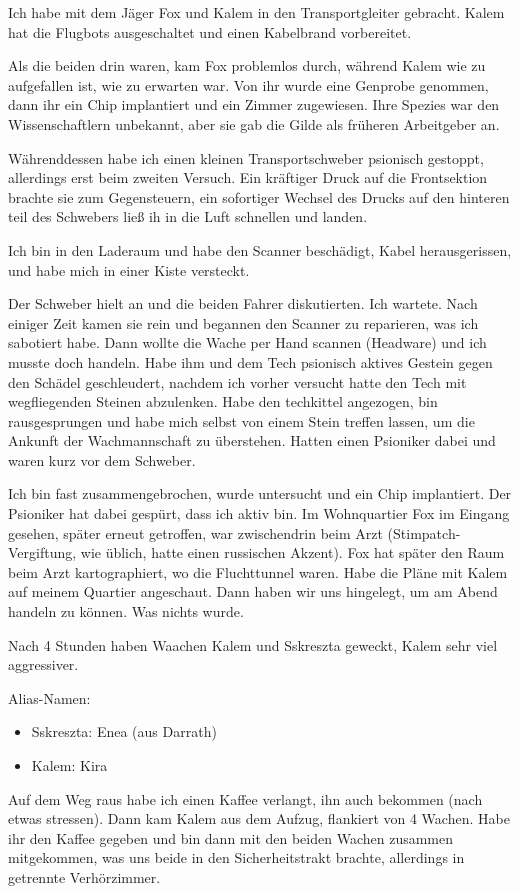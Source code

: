 \documentclass[11pt]{scrartcl}
\begin{document}
Ich habe mit dem Jäger Fox und Kalem in den Transportgleiter gebracht.
Kalem hat die Flugbots ausgeschaltet und einen Kabelbrand vorbereitet.

Als die beiden drin waren, kam Fox problemlos durch, während Kalem wie
zu aufgefallen ist, wie zu erwarten war. Von ihr wurde eine Genprobe
genommen, dann ihr ein Chip implantiert und ein Zimmer zugewiesen. Ihre
Spezies war den Wissenschaftlern unbekannt, aber sie gab die Gilde als
früheren Arbeitgeber an.

Währenddessen habe ich einen kleinen Transportschweber psionisch
gestoppt, allerdings erst beim zweiten Versuch. Ein kräftiger Druck auf
die Frontsektion brachte sie zum Gegensteuern, ein sofortiger Wechsel
des Drucks auf den hinteren teil des Schwebers ließ ih in die Luft
schnellen und landen.

Ich bin in den Laderaum und habe den Scanner beschädigt, Kabel
herausgerissen, und habe mich in einer Kiste versteckt.

Der Schweber hielt an und die beiden Fahrer diskutierten. Ich wartete.
Nach einiger Zeit kamen sie rein und begannen den Scanner zu reparieren,
was ich sabotiert habe. Dann wollte die Wache per Hand scannen
(Headware) und ich musste doch handeln. Habe ihm und dem Tech psionisch
aktives Gestein gegen den Schädel geschleudert, nachdem ich vorher
versucht hatte den Tech mit wegfliegenden Steinen abzulenken. Habe den
techkittel angezogen, bin rausgesprungen und habe mich selbst von einem
Stein treffen lassen, um die Ankunft der Wachmannschaft zu überstehen.
Hatten einen Psioniker dabei und waren kurz vor dem Schweber.

Ich bin fast zusammengebrochen, wurde untersucht und ein Chip
implantiert. Der Psioniker hat dabei gespürt, dass ich aktiv bin. Im
Wohnquartier Fox im Eingang gesehen, später erneut getroffen, war
zwischendrin beim Arzt (Stimpatch-Vergiftung, wie üblich, hatte einen
russischen Akzent). Fox hat später den Raum beim Arzt kartographiert, wo
die Fluchttunnel waren. Habe die Pläne mit Kalem auf meinem Quartier
angeschaut. Dann haben wir uns hingelegt, um am Abend handeln zu können.
Was nichts wurde.

Nach 4 Stunden haben Waachen Kalem und Sskreszta geweckt, Kalem sehr
viel aggressiver.

Alias-Namen:

\begin{itemize}
\item
  Sskreszta: Enea (aus Darrath)
\item
  Kalem: Kira
\end{itemize}
Auf dem Weg raus habe ich einen Kaffee verlangt, ihn auch bekommen (nach
etwas stressen). Dann kam Kalem aus dem Aufzug, flankiert von 4 Wachen.
Habe ihr den Kaffee gegeben und bin dann mit den beiden Wachen zusammen
mitgekommen, was uns beide in den Sicherheitstrakt brachte, allerdings
in getrennte Verhörzimmer.
\end{document}
